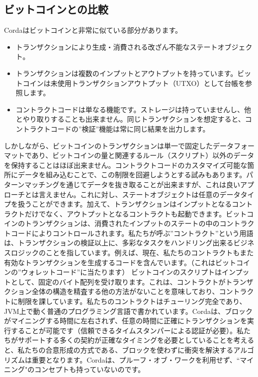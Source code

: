 \documentclass{article}
\begin{document}
\subsection{ビットコインとの比較}
Cordaはビットコインと非常に似ている部分があります。
\begin{itemize}
\item{トランザクションにより生成・消費される改ざん不能なステートオブジェクト。}
\item{トランザクションは複数のインプットとアウトプットを持っています。ビットコインは未使用トランザクションアウトプット（UTXO）として台帳を参照します。}
\item{コントラクトコードは単なる機能です。ストレージは持っていませんし、他とやり取りすることも出来ません。同じトランザクションを想定すると、コントラクトコードの”検証”機能は常に同じ結果を出力します。}
\end{itemize}
しかしながら、ビットコインのトランザクションは単一で固定したデータフォーマットであり、ビットコインの量と関連するルール（スクリプト）以外のデータを保持することはほぼ出来ません。コントラクトコードのカスタマイズ可能な箇所にデータを組み込むことで、この制限を回避しようとする試みもあります。パターンマッチングを通じてデータを抜き取ることが出来ますが、これは良いアプローチとは言えません。これに対し、ステートオブジェクトは任意のデータタイプを扱うことができます。加えて、トランザクションはインプットとなるコントラクトだけでなく、アウトプットとなるコントラクトも起動できます。ビットコインのトランザクションは、消費されたインプットのステートの中のコントラクトコードによりコントロールされます。私たちが呼ぶ”コントラクト”という用語は、トランザクションの検証以上に、多彩なタスクをハンドリング出来るビジネスロジックのことを指しています。例えば、現在、私たちのコントラクトもまた有効なトランザクションを生成するコードを含んでいます。（これはビットコインの”ウォレットコード”に当たります）
ビットコインのスクリプトはインプットとして、固定のバイト配列を受け取ります。これは、コントラクトがトランザクション全体の構造を精査する他の方法がないことを意味しており、コントラクトに制限を課しています。私たちのコントラクトはチューリング完全であり、JVM上で動く普通のプログラミング言語で書かれています。Cordaは、ブロックがマイニングする時間に左右されず、任意の時間に正確にトランザクションを実行することが可能です（信頼できるタイムスタンパーによる認証が必要）。私たちがサポートする多くの契約が正確なタイミングを必要としていることを考えると、私たちの合意形成の方式である、ブロックを使わずに衝突を解決するアルゴリズムは重要となります。Cordaは、プルーフ・オブ・ワークを利用せず、``マイニング"のコンセプトも持っていないのです。
\end{document}
